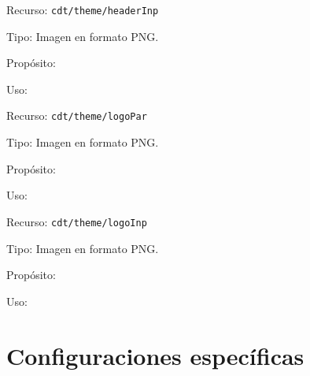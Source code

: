 \begin{Cdescription}
	\item[Recurso:] {\tt cdt/theme/headerInp}
	\item[Tipo:] Imagen en formato PNG.
	\item[Propósito:]
	\item[Uso:]
\end{Cdescription}

\begin{Cdescription}
	\item[Recurso:] {\tt cdt/theme/logoPar}
	\item[Tipo:] Imagen en formato PNG.
	\item[Propósito:]
	\item[Uso:]
\end{Cdescription}

\begin{Cdescription}
	\item[Recurso:] {\tt cdt/theme/logoInp}
	\item[Tipo:] Imagen en formato PNG.
	\item[Propósito:]
	\item[Uso:]
\end{Cdescription}

\section{Configuraciones específicas}

